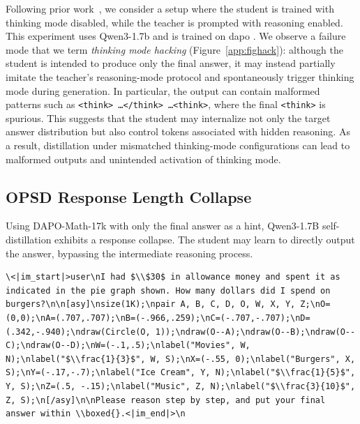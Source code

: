 Following prior work~\cite{zhao2026selfdistilledreasoneronpolicyselfdistillation}, we consider a setup where the student is trained with thinking mode disabled, while the teacher is prompted with reasoning enabled. This experiment uses Qwen3-1.7b and is trained on dapo \cite{yu2025dapoopensourcellmreinforcement}. We observe a failure mode that we term \emph{thinking mode hacking} (Figure~\ref{app:fighack}): although the student is intended to produce only the final answer, it may instead partially imitate the teacher's reasoning-mode protocol and spontaneously trigger thinking mode during generation. In particular, the output can contain malformed patterns such as \texttt{<think> \ldots </think> \ldots <think>}, where the final \texttt{<think>} is spurious. This suggests that the student may internalize not only the target answer distribution but also control tokens associated with hidden reasoning. As a result, distillation under mismatched thinking-mode configurations can lead to malformed outputs and unintended activation of thinking mode.


\subsection{OPSD Response Length Collapse}
\label{app:opsdcollapse}

Using DAPO-Math-17k with only the final answer as a hint, Qwen3-1.7B self-distillation exhibits a response collapse.  The student may learn to directly output the answer, bypassing the intermediate reasoning process.

\begin{promptbox}
\begin{Verbatim}[breaklines=true, breakanywhere=true, fontsize=\small]
\<|im_start|>user\nI had $\\$30$ in allowance money and spent it as indicated in the pie graph shown. How many dollars did I spend on burgers?\n\n[asy]\nsize(1K);\npair A, B, C, D, O, W, X, Y, Z;\nO=(0,0);\nA=(.707,.707);\nB=(-.966,.259);\nC=(-.707,-.707);\nD=(.342,-.940);\ndraw(Circle(O, 1));\ndraw(O--A);\ndraw(O--B);\ndraw(O--C);\ndraw(O--D);\nW=(-.1,.5);\nlabel("Movies", W, N);\nlabel("$\\frac{1}{3}$", W, S);\nX=(-.55, 0);\nlabel("Burgers", X, S);\nY=(-.17,-.7);\nlabel("Ice Cream", Y, N);\nlabel("$\\frac{1}{5}$", Y, S);\nZ=(.5, -.15);\nlabel("Music", Z, N);\nlabel("$\\frac{3}{10}$", Z, S);\n[/asy]\n\nPlease reason step by step, and put your final answer within \\boxed{}.<|im_end|>\n
\end{Verbatim}
\end{promptbox}

